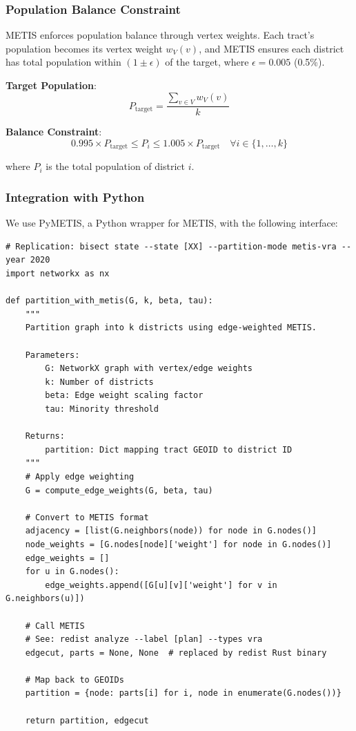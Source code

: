 \subsubsection{Population Balance Constraint}

METIS enforces population balance through vertex weights. Each tract's population becomes its vertex weight $w_V(v)$, and METIS ensures each district has total population within $(1 \pm \epsilon)$ of the target, where $\epsilon = 0.005$ (0.5\%).

\textbf{Target Population}:
\[
P_{\text{target}} = \frac{\sum_{v \in V} w_V(v)}{k}
\]

\textbf{Balance Constraint}:
\[
0.995 \times P_{\text{target}} \leq P_i \leq 1.005 \times P_{\text{target}} \quad \forall i \in \{1, \ldots, k\}
\]

where $P_i$ is the total population of district $i$.

\subsubsection{Integration with Python}

We use PyMETIS, a Python wrapper for METIS, with the following interface:

\begin{verbatim}
# Replication: bisect state --state [XX] --partition-mode metis-vra --year 2020
import networkx as nx

def partition_with_metis(G, k, beta, tau):
    """
    Partition graph into k districts using edge-weighted METIS.

    Parameters:
        G: NetworkX graph with vertex/edge weights
        k: Number of districts
        beta: Edge weight scaling factor
        tau: Minority threshold

    Returns:
        partition: Dict mapping tract GEOID to district ID
    """
    # Apply edge weighting
    G = compute_edge_weights(G, beta, tau)

    # Convert to METIS format
    adjacency = [list(G.neighbors(node)) for node in G.nodes()]
    node_weights = [G.nodes[node]['weight'] for node in G.nodes()]
    edge_weights = []
    for u in G.nodes():
        edge_weights.append([G[u][v]['weight'] for v in G.neighbors(u)])

    # Call METIS
    # See: redist analyze --label [plan] --types vra
    edgecut, parts = None, None  # replaced by redist Rust binary

    # Map back to GEOIDs
    partition = {node: parts[i] for i, node in enumerate(G.nodes())}

    return partition, edgecut
\end{verbatim}

